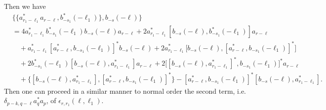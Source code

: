 \documentclass[sn-mathphys, Numbered ,a4paper]{sn-jnl}%
\theoremstyle{plain}
\theoremstyle{definition}
\theoremstyle{remark}
\theoremstyle{plain}
\theoremstyle{definition}
\theoremstyle{remark}
\begin{document}
Then we have
\begin{align}
    &\big\{\{a^*_{r_1-\ell_1}a_{r-\ell}, b^*_{-s_1}(-\ell_1)\},b_{-s}(-\ell)\big\}\nonumber\\
    &=4a^*_{r_1-\ell_1}b^*_{-s_1}(-\ell_1)b_{-s}(-\ell)a_{r-\ell} + 2a^*_{r_1-\ell_1}[b_{-s}(-\ell),b^*_{-s_1}(-\ell_1)]a_{r-\ell}\nonumber\\ 
    &\quad + a^*_{r_1-\ell_1}[a^*_{r-\ell}, b_{-s_1}(-\ell_1)]^*b_{-s}(-\ell) + 2a^*_{r_1-\ell_1}\big[b_{-s}(-\ell),[a^*_{r-\ell}, b_{-s_1}(-\ell_1)]^*\big]\nonumber\\
    &\quad + 2b^*_{-s_1}(-\ell_1)[b_{-s}(-\ell),a^*_{r_1-\ell_1}]a_{r-\ell} +2\big[[b_{-s}(-\ell),a^*_{r_1-\ell_1}]^*,b_{-s_1}(-\ell_1)\big]^*a_{r-\ell}\nonumber\\
    &\quad + \big\{ [b_{-s}(-\ell),a^*_{r_1-\ell_1}],[a^*_{r-\ell}, b_{-s_1}(-\ell_1)]^*\big\} - [a^*_{r-\ell}, b_{-s_1}(-\ell_1)]^*[b_{-s}(-\ell),a^*_{r_1-\ell_1}].\label{eq:no2comm}
\end{align}
Then one can proceed in a similar manner to normal order the second term, i.e. $\delta_{p-k,q-\ell}a^*_{q}a_{p}$, of $\epsilon_{r,r_1}(\ell, \ell_1)$.
\end{document}
